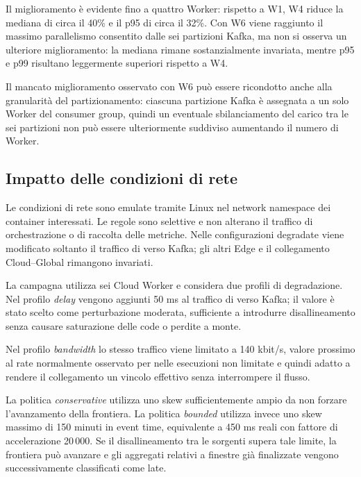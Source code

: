 Il miglioramento è evidente fino a quattro Worker: rispetto a W1, W4 riduce
la mediana di circa il 40\% e il p95 di circa il 32\%. Con W6 viene raggiunto
il massimo parallelismo consentito dalle sei partizioni Kafka, ma non si
osserva un ulteriore miglioramento: la mediana rimane sostanzialmente
invariata, mentre p95 e p99 risultano leggermente superiori rispetto a W4.

Il mancato miglioramento osservato con W6 può essere ricondotto anche alla
granularità del partizionamento: ciascuna partizione Kafka è assegnata a un
solo Worker del consumer group, quindi un eventuale sbilanciamento del carico
tra le sei partizioni non può essere ulteriormente suddiviso aumentando il
numero di Worker.


\subsection{Impatto delle condizioni di rete}

Le condizioni di rete sono emulate tramite Linux  nel network
namespace dei container interessati. Le regole sono selettive e non alterano
il traffico di orchestrazione o di raccolta delle metriche. Nelle
configurazioni degradate viene modificato soltanto il traffico di
 verso Kafka; gli altri Edge e il collegamento Cloud--Global
rimangono invariati.

La campagna utilizza sei Cloud Worker e considera due profili di degradazione.
Nel profilo \emph{delay} vengono aggiunti 50 ms al traffico di
 verso Kafka; il valore è stato scelto come perturbazione
moderata, sufficiente a introdurre disallineamento senza causare saturazione
delle code o perdite a monte.

Nel profilo \emph{bandwidth} lo stesso traffico viene limitato a 140 kbit/s,
valore prossimo al rate normalmente osservato per  nelle
esecuzioni non limitate e quindi adatto a rendere il collegamento un vincolo
effettivo senza interrompere il flusso.

La politica \emph{conservative} utilizza uno skew sufficientemente ampio da
non forzare l'avanzamento della frontiera. La politica \emph{bounded} utilizza
invece uno skew massimo di 150 minuti in event time, equivalente a 450 ms
reali con fattore di accelerazione 20\,000. Se il disallineamento tra le
sorgenti supera tale limite, la frontiera può avanzare e gli aggregati
relativi a finestre già finalizzate vengono successivamente classificati
come late.

